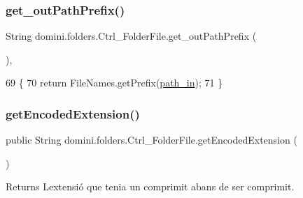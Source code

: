 \subsubsection{\texorpdfstring{get\+\_\+out\+Path\+Prefix()}{get\_outPathPrefix()}}
{\footnotesize\ttfamily String domini.\+folders.\+Ctrl\+\_\+\+Folder\+File.\+get\+\_\+out\+Path\+Prefix (\begin{DoxyParamCaption}{ }\end{DoxyParamCaption})\hspace{0.3cm}{\ttfamily [inline]}, {\ttfamily [private]}}


\begin{DoxyCode}
69                                        \{
70         \textcolor{keywordflow}{return} FileNames.getPrefix(\hyperlink{classdomini_1_1folders_1_1Ctrl__FolderFile_a0d3946bb2832a1f34d0c2227df5c71c4}{path\_in});
71     \}
\end{DoxyCode}
\mbox{\label{classdomini_1_1folders_1_1Ctrl__FolderFile_a61d9dfde0932787a2398af3ddf99c34b}} 
\subsubsection{\texorpdfstring{get\+Encoded\+Extension()}{getEncodedExtension()}}
{\footnotesize\ttfamily public String domini.\+folders.\+Ctrl\+\_\+\+Folder\+File.\+get\+Encoded\+Extension (\begin{DoxyParamCaption}{ }\end{DoxyParamCaption})\hspace{0.3cm}{\ttfamily [inline]}}

\begin{DoxyReturn}{Returns}
L\textquotesingle{}extensió que tenia un comprimit abans de ser comprimit. 
\end{DoxyReturn}


